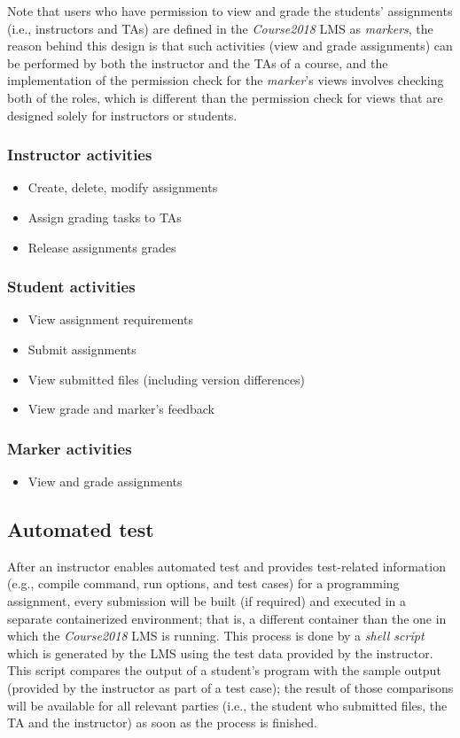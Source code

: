 \medskip 

Note that users who have permission to view and grade the students' assignments
(i.e., instructors and TAs)
are defined in the \emph{Course2018} LMS as \emph{markers}, the reason behind
this design is that such activities (view and grade assignments) can be
performed by both the instructor and the TAs of a course, and the implementation
of the permission check for the \emph{marker}'s views involves checking both
of the roles, which is different than the permission check for views that are
designed solely for instructors or students.

\medskip

\subsubsection{Instructor activities}
\begin{itemize}
    \item Create, delete, modify assignments
    \item Assign grading tasks to TAs
    \item Release assignments grades
\end{itemize}

\subsubsection{Student activities}
\begin{itemize}
    \item View assignment requirements
    \item Submit assignments
    \item View submitted files (including version differences)
    \item View grade and marker's feedback
\end{itemize}

\subsubsection{Marker activities}
\begin{itemize}
    \item View and grade assignments
\end{itemize}

\subsection{Automated test}
After an instructor enables automated test and provides test-related
information (e.g., compile command, run options, and test cases) for a
programming assignment,
every submission will be built (if required) and executed in a separate
containerized environment; that is, a different
container than the one in which the \emph{Course2018} LMS is running.
This process is done by a \emph{shell script} which is generated by the LMS
using the test data provided by the instructor. This script compares the
output of a student's program with the sample output (provided by the instructor
as part of a test case); the result of those comparisons will be available for
all relevant parties (i.e., the student who submitted files, the TA and
the instructor) as soon as the process is finished.

